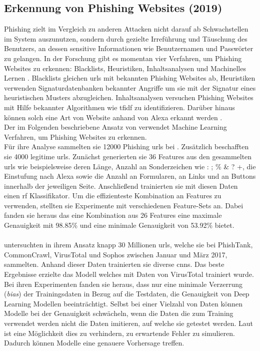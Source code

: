 \documentclass[
    12pt, %
    DIV10,
    ngerman, %
    a4paper, %
    oneside, %
    titlepage, %
    parskip=half, %
    headings=normal, %
    listof=totoc, %
    bibliography=totoc, %
    index=totoc, %
    captions=tableheading, %
    final %
]{scrreprt}
\begin{document}
\subsection{Erkennung von Phishing Websites (2019)}
Phishing zielt im Vergleich zu anderen Attacken nicht darauf ab Schwachstellen im System auszunutzen, sondern durch gezielte Irreführung und Täuschung des Benutzers, an dessen sensitive Informationen wie Benutzernamen und Passwörter zu gelangen.
In der Forschung gibt es momentan vier Verfahren, um Phishing Websites zu erkennen: Blacklists, Heuristiken, Inhaltsanalysen und Machinelles Lernen \parencite{Alswailem2019}. Blacklists gleichen \ac{urls} mit bekannten Phishing Websites ab, Heuristiken verwenden Signaturdatenbanken bekannter Angriffe um sie mit der Signatur eines heuristischen Musters abzugleichen. Inhaltsanalysen versuchen Phishing Websites mit Hilfe bekannter Algorithmen wie \ac{tfidf} zu identifizieren. Darüber hinaus können solch eine Art von Website anhand von Alexa erkannt werden \parencite{nguyen2013detecting}. \\
Der im Folgenden beschriebene Ansatz von \textcite{Alswailem2019} verwendet Machine Learning Verfahren, um Phishing Websites zu erkennen.\\
Für ihre Analyse sammelten sie 12000 Phishing \ac{urls} bei \textcite{PhishTank}. Zusätzlich beschafften sie 4000 legitime \ac{urls}. Zunächst generierten sie 36 Features aus den gesammelten \ac{urls} wie beispielsweise deren Länge, Anzahl an Sonderzeichen wie : ; \% \& ? +, die Einstufung nach Alexa sowie die Anzahl an Formularen, an Links und an Buttons innerhalb der jeweiligen Seite. Anschlie{\ss}end trainierten sie mit diesen Daten einen \ac{rf} Klassifikator. Um die effizienteste Kombination an Features zu verwenden, stellten sie Experimente mit verschiedenen Feature-Sets an. Dabei fanden sie heraus das eine Kombination aus 26 Features eine maximale Genauigkeit mit 98.85\% und eine minimale Genauigkeit von 53.92\% bietet. 
\\\\
\textcite{Hillary2017} untersuchten in ihrem Ansatz knapp 30 Millionen \ac{urls}, welche sie bei PhishTank, CommonCrawl, VirusTotal und Sophos zwischen Januar und März 2017, sammelten. Anhand dieser Daten trainierten sie diverse \ac{cnns}. Das beste Ergebnisse erzielte das Modell welches mit Daten von VirusTotal trainiert wurde. Bei ihren Experimenten fanden sie heraus, dass nur eine minimale Verzerrung (\emph{bias}) der Trainingsdaten in Bezug auf die Testdaten, die Genauigkeit von Deep Learning Modellen beeinträchtigt. Selbst bei einer Vielzahl von Daten können Modelle bei der Genauigkeit schwächeln, wenn die Daten die zum Training verwendet werden nicht die Daten imitieren, auf welche sie getestet werden. Laut \citeauthor{Hillary2017} ist eine Möglichkeit dies zu verhindern, zu erwartende Fehler zu simulieren. Dadurch können Modelle eine genauere Vorhersage treffen.
%
\end{document}
